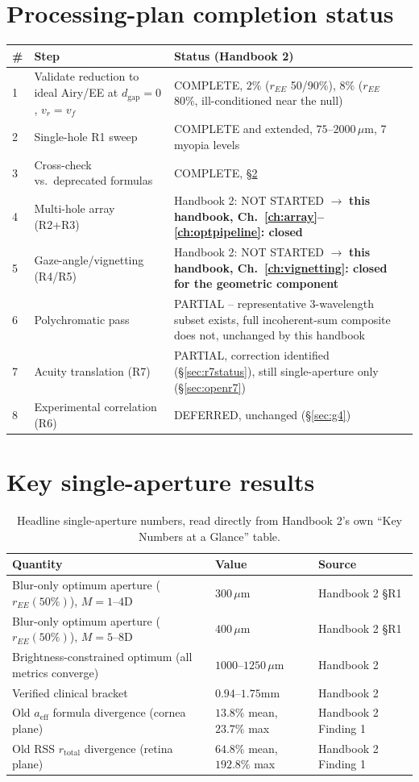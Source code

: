 \documentclass[11pt]{report}
\newcommand{\dgap}{d_{\text{gap}}}
\newcommand{\vr}{v_r}
\newcommand{\vf}{v_f}
\begin{document}
\section{Processing-plan completion status}
\begin{longtable}{p{0.6cm}p{6.9cm}p{6.1cm}}
\toprule
\textbf{\#} & \textbf{Step} & \textbf{Status (Handbook 2)} \\
\midrule
\endhead
1 & Validate reduction to ideal Airy/EE at $\dgap{=}0$, $\vr{=}\vf$ & COMPLETE, $2\%$
($r_{EE}$ 50/90\%), $8\%$ ($r_{EE}$ 80\%, ill-conditioned near the null) \\
2 & Single-hole R1 sweep & COMPLETE and extended, $75$--$2000\,\mu$m, 7 myopia levels \\
3 & Cross-check vs.\ deprecated formulas & COMPLETE, \S\ref{sec:r1result} \\
4 & Multi-hole array (R2+R3) & Handbook 2: NOT STARTED $\to$ \textbf{this handbook,
Ch.~\ref{ch:array}--\ref{ch:optpipeline}: closed} \\
5 & Gaze-angle/vignetting (R4/R5) & Handbook 2: NOT STARTED $\to$ \textbf{this handbook,
Ch.~\ref{ch:vignetting}: closed for the geometric component} \\
6 & Polychromatic pass & PARTIAL -- representative 3-wavelength subset exists, full
incoherent-sum composite does not, unchanged by this handbook \\
7 & Acuity translation (R7) & PARTIAL, correction identified (\S\ref{sec:r7status}),
still single-aperture only (\S\ref{sec:openr7}) \\
8 & Experimental correlation (R6) & DEFERRED, unchanged (\S\ref{sec:g4}) \\
\bottomrule
\end{longtable}

\section{Key single-aperture results}
\label{sec:r1result}
\begin{table}[h!]
\centering\small
\begin{tabular}{p{7.2cm}p{3.0cm}p{2.5cm}}
\toprule
\textbf{Quantity} & \textbf{Value} & \textbf{Source} \\
\midrule
Blur-only optimum aperture ($r_{EE}(50\%)$), $M{=}1$--$4$D & $300\,\mu$m & Handbook 2 \S R1 \\
Blur-only optimum aperture ($r_{EE}(50\%)$), $M{=}5$--$8$D & $400\,\mu$m & Handbook 2 \S R1 \\
Brightness-constrained optimum (all metrics converge) & $1000$--$1250\,\mu$m & Handbook 2 \\
Verified clinical bracket & $0.94$--$1.75$mm & Handbook 2 \\
Old $a_{\text{eff}}$ formula divergence (cornea plane) & $13.8\%$ mean, $23.7\%$ max &
Handbook 2 Finding 1 \\
Old RSS $r_{\text{total}}$ divergence (retina plane) & $64.8\%$ mean, $192.8\%$ max &
Handbook 2 Finding 1 \\
\bottomrule
\end{tabular}
\caption{Headline single-aperture numbers, read directly from Handbook 2's own
``Key Numbers at a Glance'' table.}
\end{table}
\end{document}
